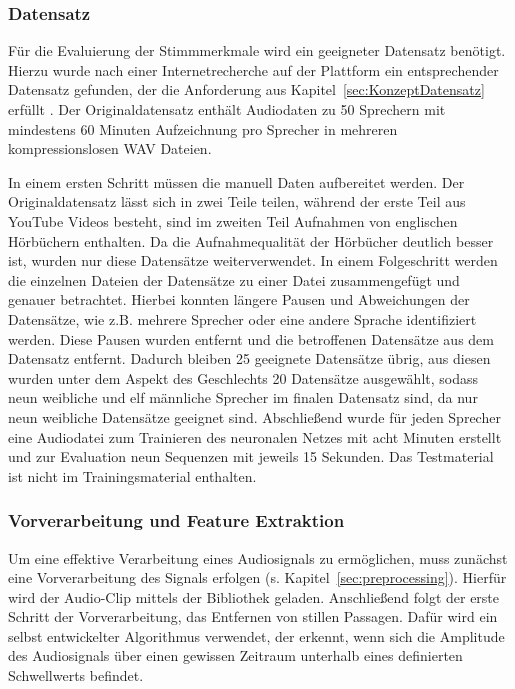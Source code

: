 \subsubsection{Datensatz}
Für die Evaluierung der Stimmmerkmale wird ein geeigneter Datensatz benötigt.
Hierzu wurde nach einer Internetrecherche auf der Plattform  ein entsprechender Datensatz gefunden, der die Anforderung aus Kapitel~\ref{sec:KonzeptDatensatz} erfüllt \autocite[vgl.][]{jain_speaker_2019}. 
Der Originaldatensatz enthält Audiodaten zu 50 Sprechern mit mindestens 60 Minuten Aufzeichnung pro Sprecher in mehreren kompressionslosen WAV Dateien.

In einem ersten Schritt müssen die manuell Daten aufbereitet werden.
Der Originaldatensatz lässt sich in zwei Teile teilen, während der erste Teil aus YouTube Videos besteht, sind im zweiten Teil Aufnahmen von englischen Hörbüchern enthalten.
Da die Aufnahmequalität der Hörbücher deutlich besser ist, wurden nur diese Datensätze weiterverwendet.
In einem Folgeschritt werden die einzelnen Dateien der Datensätze zu einer Datei zusammengefügt und genauer betrachtet.
Hierbei konnten längere Pausen und Abweichungen der Datensätze, wie z.B. mehrere Sprecher oder eine andere Sprache identifiziert werden.
Diese Pausen wurden entfernt und die betroffenen Datensätze aus dem Datensatz entfernt.
Dadurch bleiben 25 geeignete Datensätze übrig, aus diesen wurden unter dem Aspekt des Geschlechts 20 Datensätze ausgewählt, sodass neun weibliche und elf männliche Sprecher im finalen Datensatz sind, da nur neun weibliche Datensätze geeignet sind.
Abschließend wurde für jeden Sprecher eine Audiodatei zum Trainieren des neuronalen Netzes mit acht Minuten erstellt und zur Evaluation neun Sequenzen mit jeweils 15 Sekunden.
Das Testmaterial ist nicht im Trainingsmaterial enthalten.

\subsubsection{Vorverarbeitung und Feature Extraktion}\label{section:umsetzung-versuch-vorverarbeitung}

Um eine effektive Verarbeitung eines Audiosignals zu ermöglichen, muss zunächst eine Vorverarbeitung des Signals erfolgen (s. Kapitel~\ref{sec:preprocessing}).
Hierfür wird der Audio-Clip mittels der Bibliothek  geladen.
Anschließend folgt der erste Schritt der Vorverarbeitung, das Entfernen von stillen Passagen.
Dafür wird ein selbst entwickelter Algorithmus verwendet, der erkennt, wenn sich die Amplitude des Audiosignals über einen gewissen Zeitraum unterhalb eines definierten Schwellwerts befindet.

